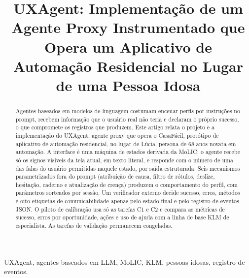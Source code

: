 \documentclass[conference]{IEEEtran}
\begin{document}
\title{UXAgent: Implementação de um Agente Proxy Instrumentado que Opera um Aplicativo de Automação Residencial no Lugar de uma Pessoa Idosa}

\author{
\and
{}
}

\maketitle

\begin{abstract}
Agentes baseados em modelos de linguagem costumam encenar perfis por instruções no prompt, recebem informação que o usuário real não teria e declaram o próprio sucesso, o que compromete os registros que produzem. Este artigo relata o projeto e a implementação do UXAgent, agente proxy que opera o CasaFácil, protótipo de aplicativo de automação residencial, no lugar de Lúcia, persona de 68 anos novata em automação. A interface é uma máquina de estados derivada da MoLIC; o agente recebe só os signos visíveis da tela atual, em texto literal, e responde com o número de uma das falas do usuário permitidas naquele estado, por saída estruturada. Seis mecanismos parametrizados fora do prompt (atribuição de causa, filtro de rótulos, deslize, hesitação, caderno e atualização de crença) produzem o comportamento do perfil, com parâmetros sorteados por sessão. Um verificador externo decide sucesso, erros, métodos e oito etiquetas de comunicabilidade apenas pelo estado final e pelo registro de eventos JSON. O piloto de calibração usa só as tarefas C1 e C2 e compara as métricas de sucesso, erros por oportunidade, ações e uso de ajuda com a linha de base KLM de especialista. As tarefas de validação permanecem congeladas.
\end{abstract}

\begin{IEEEkeywords}
UXAgent, agentes baseados em LLM, MoLIC, KLM, pessoas idosas, registro de eventos.
\end{IEEEkeywords}
\end{document}
